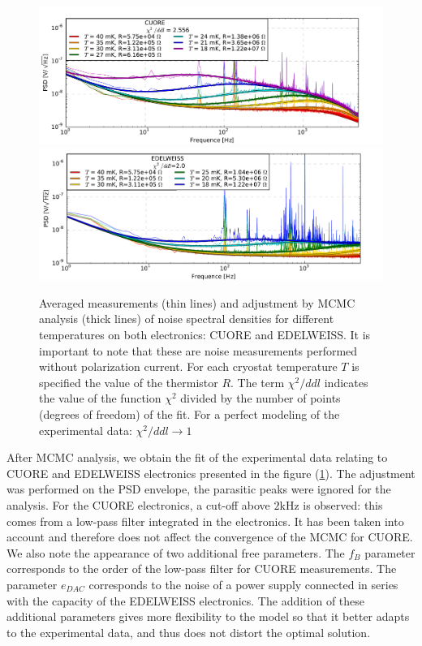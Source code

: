 \begin{figure}[!ht]
\begin{center}
\includegraphics[width=\textwidth]{Images/cuore_fit_fin.pdf}
\includegraphics[width=\textwidth]{Images/edel_fit_fin.pdf}
\end{center}
\caption{Averaged measurements (thin lines) and adjustment by MCMC analysis (thick lines) of noise spectral densities for different temperatures on both electronics: CUORE and EDELWEISS. It is important to note that these are noise measurements performed without polarization current. For each cryostat temperature $T$ is specified the value of the thermistor $R$. The term $\chi^2/ddl$ indicates the value of the function $\chi^2$ divided by the number of points (degrees of freedom) of the fit. For a perfect modeling of the experimental data: $\chi^2/ddl \rightarrow 1$}
\label{rainbow-plot}
\end{figure}

After MCMC analysis, we obtain the fit of the experimental data relating to CUORE and EDELWEISS electronics presented in the figure (\ref{rainbow-plot}). The adjustment was performed on the PSD envelope, the parasitic peaks were ignored for the analysis. For the CUORE electronics, a cut-off above $2$kHz is observed: this comes from a low-pass filter integrated in the electronics. It has been taken into account and therefore does not affect the convergence of the MCMC for CUORE. We also note the appearance of two additional free parameters. The $f_B$ parameter corresponds to the order of the low-pass filter for CUORE measurements. The parameter $e_{DAC}$ corresponds to the noise of a power supply connected in series with the capacity of the EDELWEISS electronics. The addition of these additional parameters gives more flexibility to the model so that it better adapts to the experimental data, and thus does not distort the optimal solution.

